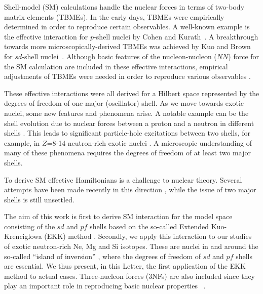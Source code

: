 \documentclass[aps,prl,twocolumn,groupedaddress,showkeys,showpacs,floatfix,superscriptaddress]{revtex4-1}
\newcommand\+{^\dagger}
\begin{document}
Shell-model (SM) calculations handle the
nuclear forces in terms of two-body matrix elements (TBMEs).  
In the early days, TBMEs were empirically
determined in order to reproduce certain observables.  
A well-known example is the effective interaction for
$p$-shell nuclei by Cohen and Kurath~\cite{Cohen:1965kz}.  A
breakthrough towards more microscopically-derived TBMEs was
achieved by Kuo and Brown for $sd$-shell nuclei~\cite{KuoBrown}.
Although basic features of the nucleon-nucleon ($NN$) force for the SM calculation 
are included in these effective interactions, empirical adjustments of TBMEs
were needed in order to reproduce various observables 
\cite{Brown1988191,RevModPhys.77.427,PhysRevC.65.061301}.

These effective interactions were all derived for a Hilbert
space represented by the degrees of freedom of one major (oscillator) 
shell. As we move towards exotic nuclei,
some new features and phenomena arise.
A notable example can be the shell evolution due to
nuclear forces between a proton and a neutron in different shells 
\cite{PhysRevLett.95.232502,Otsuka:2009qs,nobel_otsuka}.
This leads to significant particle-hole excitations between two shells, for example,  
in $Z$=8-14 neutron-rich exotic nuclei  
\cite{PhysRevLett.95.232502,Otsuka:2009qs,nobel_otsuka,Sorlin:2008er,Gade:2008we,Campi:1975un,Warburton:1990vw,Fukunishi:1992ic,PhysRevC.60.054315,Caurier:2013aoa,RevModPhys.77.427}. 
A microscopic understanding of many of these phenomena requires the degrees of
freedom of at least two major shells. 

To derive SM effective Hamiltonians 
is a challenge to nuclear theory. Several attempts have
been made recently in this direction
\cite{LisetskiyPhysRevC78,Bogner.PhysRevLett113,PhysRevLett.113.142502,Coraggio:2013dm,Coraggio:2014cf,Simonis2015,Jansen:2016ik},
while the issue of two major shells is still unsettled. 

The aim of this work is first to derive SM interaction for the model
space consisting of the $sd$ and $pf$ shells 
based on the so-called Extended Kuo-Krenciglowa
(EKK) method \cite{Takayanagi201161,Takayanagi:2011dv,Tsunoda:2014hj}.
Secondly, we apply this interaction to our studies of exotic neutron-rich Ne, Mg and Si isotopes. These are nuclei in and around
the so-called ``island of inversion'' \cite{Warburton:1990vw}, 
where the degrees of freedom of $sd$ and $pf$ shells are essential.
We thus present, in this Letter, the first application of the EKK method to actual cases.
Three-nucleon forces (3NFs) are also included 
since they play an important role in
reproducing basic nuclear properties  
~\cite{PhysRevLett.105.032501,Holt:2012gc,hagen2012a,hagen2012b,Ekstrom:2015gw}.
\end{document}
